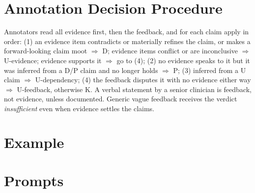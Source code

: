 \documentclass[11pt]{article}
\newcommand{\D}{\textsc{D}}
\newcommand{\Pp}{\textsc{P}}
\newcommand{\K}{\textsc{K}}
\newcommand{\U}{\textsc{U}}
\begin{document}


\appendix
\section{Annotation Decision Procedure}
\label{app:guide}
Annotators read all evidence first, then the feedback, and for each claim apply in order: (1) an evidence item contradicts or materially refines the claim, or makes a forward-looking claim moot $\Rightarrow$ \D; evidence items conflict or are inconclusive $\Rightarrow$ \U-evidence; evidence supports it $\Rightarrow$ go to (4); (2) no evidence speaks to it but it was inferred from a \D/\Pp{} claim and no longer holds $\Rightarrow$ \Pp; (3) inferred from a \U{} claim $\Rightarrow$ \U-dependency; (4) the feedback disputes it with no evidence either way $\Rightarrow$ \U-feedback, otherwise \K. A verbal statement by a senior clinician is feedback, not evidence, unless documented. Generic vague feedback receives the verdict \emph{insufficient} even when evidence settles the claims.

\section{Example}
\label{app:example}


\section{Prompts}

\end{document}
